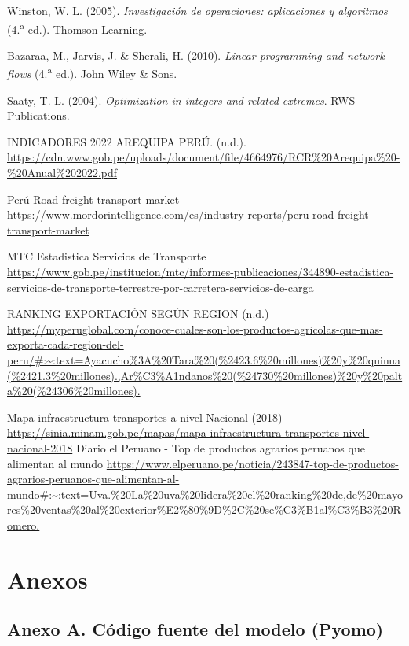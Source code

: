 \documentclass[11pt,a4paper]{article}
\begin{document}
\begin{flushleft}
\hangindent=1cm 
Winston, W. L. (2005). \textit{Investigaci\'on de operaciones: aplicaciones y algoritmos} (4.\textsuperscript{a} ed.). Thomson Learning.

\hangindent=1cm 
Bazaraa, M., Jarvis, J. \& Sherali, H. (2010). \textit{Linear programming and network flows} (4.\textsuperscript{a} ed.). John Wiley \& Sons.

\hangindent=1cm 
Saaty, T. L. (2004). \textit{Optimization in integers and related extremes}. RWS Publications.

\hangindent=1cm 
INDICADORES 2022 AREQUIPA PERÚ. (n.d.).
\url{https://cdn.www.gob.pe/uploads/document/file/4664976/RCR%20Arequipa%20-%20Anual%202022.pdf}

\hangindent=1cm 
Perú Road freight transport market
\url{https://www.mordorintelligence.com/es/industry-reports/peru-road-freight-transport-market}

\hangindent=1cm 
MTC Estadistica Servicios de Transporte
\url{https://www.gob.pe/institucion/mtc/informes-publicaciones/344890-estadistica-servicios-de-transporte-terrestre-por-carretera-servicios-de-carga}

\hangindent=1cm 
RANKING EXPORTACIÓN SEGÚN REGION (n.d.)
\url{https://myperuglobal.com/conoce-cuales-son-los-productos-agricolas-que-mas-exporta-cada-region-del-peru/#:~:text=Ayacucho%3A%20Tara%20(%2423.6%20millones)%20y%20quinua(%2421.3%20millones).,Ar%C3%A1ndanos%20(%24730%20millones)%20y%20palta%20(%24306%20millones).}
\end{flushleft}

\hangindent=1cm 
Mapa infraestructura transportes a nivel Nacional (2018)
\url{https://sinia.minam.gob.pe/mapas/mapa-infraestructura-transportes-nivel-nacional-2018}
\hangindent=1cm 
Diario el Peruano - Top de productos agrarios peruanos que alimentan al mundo
\url{https://www.elperuano.pe/noticia/243847-top-de-productos-agrarios-peruanos-que-alimentan-al-mundo#:~:text=Uva.%20La%20uva%20lidera%20el%20ranking%20de,de%20mayores%20ventas%20al%20exterior%E2%80%9D%2C%20se%C3%B1al%C3%B3%20Romero.}
\newpage
\section{Anexos}

\subsection*{Anexo A. C\'odigo fuente del modelo (Pyomo)}

\end{document}
